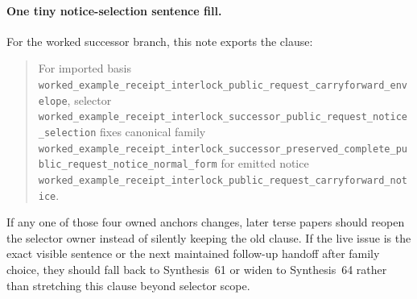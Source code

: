 \documentclass[11pt]{article}
\begin{document}
\paragraph{One tiny notice-selection sentence fill.}
For the worked successor branch, this note exports the clause:
\begin{quote}\small
For imported basis \nolinkurl{worked_example_receipt_interlock_public_request_carryforward_envelope}, selector \nolinkurl{worked_example_receipt_interlock_successor_public_request_notice_selection} fixes canonical family \nolinkurl{worked_example_receipt_interlock_successor_preserved_complete_public_request_notice_normal_form} for emitted notice \nolinkurl{worked_example_receipt_interlock_public_request_carryforward_notice}.
\end{quote}
If any one of those four owned anchors changes, later terse papers should reopen the selector owner instead of silently keeping the old clause. If the live issue is the exact visible sentence or the next maintained follow-up handoff after family choice, they should fall back to Synthesis~61 or widen to Synthesis~64 rather than stretching this clause beyond selector scope.\cite{series:workedexample}
\end{document}
